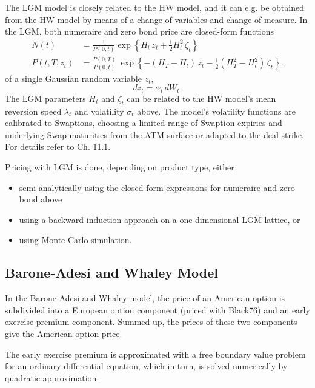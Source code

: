 The LGM model is closely related to the HW model, and it can e.g. be 
obtained from the HW model by means of a change of variables and change of measure. 
In the LGM, both numeraire and zero bond price are closed-form functions 
\begin{align*}
N(t) &= \frac{1}{P(0,t)}\exp\left\{H_t\, z_t + \frac{1}{2}H^2_t\,\zeta_t \right\} \\
P(t,T,z_t)
&= \frac{P(0,T)}{P(0,t)}\:\exp\left\{ -(H_T-H_t)\,z_t - \frac{1}{2} \left(H^2_T-H^2_t\right)\,\zeta_t\right\}.
\end{align*}
of a single Gaussian random variable $z_t$,
$$
dz_t=\alpha_t\, dW_t.
$$
The LGM parameters $H_t$ and $\zeta_t$ can be related to the HW 
model's mean reversion speed $\lambda_t$ and volatility $\sigma_t$ above.
The model's volatility functions are calibrated to Swaptions, choosing 
a limited range of Swaption expiries and underlying Swap maturities from the 
ATM surface or adapted to the deal strike. %
%
For details refer to \cite{LSG_2015} Ch. 11.1.

\medskip
Pricing with LGM is done, depending on product type, either
\begin{itemize}
\item semi-analytically using the closed form expressions for numeraire and 
zero bond above
\item using a backward induction approach on a one-dimensional 
LGM lattice, or
\item using Monte Carlo simulation.
\end{itemize}

\subsection{Barone-Adesi and Whaley Model}
\label{models:barone-adesi}

In the Barone-Adesi and Whaley model, the price of an American option is subdivided 
into a European option component (priced with Black76) and an early exercise premium 
component. Summed up, the prices of these two components give the American option price.   

The early exercise premium is approximated with a free boundary value problem for an 
ordinary differential equation, which in turn, is solved numerically by quadratic 
approximation. 

